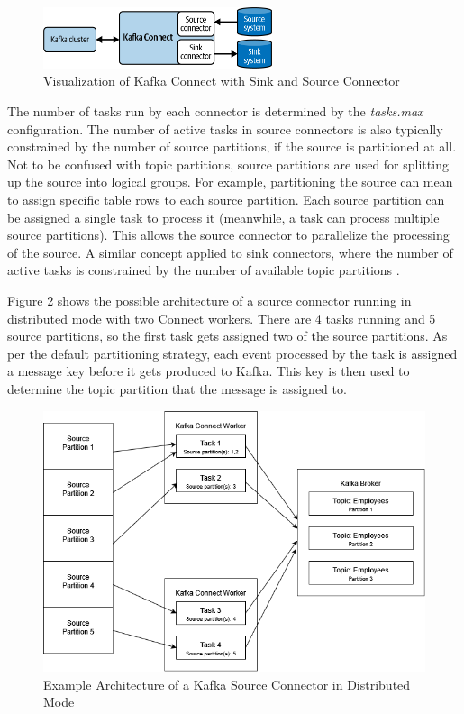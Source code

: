 \begin{figure}[htbp]
 \centering
 \includegraphics[width=0.6\textwidth]{chapters/images/kafkaconnectexample.png}
 \caption{Visualization of Kafka Connect with Sink and Source Connector \cite{maison2023kafkaconnect}}
 \label{fig:fundamentals:kafkaconnectexample}
\end{figure}

The number of tasks run by each connector is determined by the \textit{tasks.max} configuration. The number of active tasks in source connectors is also typically constrained by the number of source partitions, if the source is partitioned at all. Not to be confused with topic partitions, source partitions are used for splitting up the source into logical groups. For example, partitioning the source can mean to assign specific table rows to each source partition. Each source partition can be assigned a single task to process it (meanwhile, a task can process multiple source partitions). This allows the source connector to parallelize the processing of the source. A similar concept applied to sink connectors, where the number of active tasks is constrained by the number of available topic partitions \cite{maison2023kafkaconnect}.

Figure \ref{fig:fundamentals:kafkaconnectarchitecture} shows the possible architecture of a source connector running in distributed mode with two Connect workers. There are 4 tasks running and 5 source partitions, so the first task gets assigned two of the source partitions. As per the default partitioning strategy, each event processed by the task is assigned a message key before it gets produced to Kafka. This key is then used to determine the topic partition that the message is assigned to.

\begin{figure}[htbp]
 \centering
 \includegraphics[width=1\textwidth]{chapters/images/kafka connect architecture.drawio.png}
 \caption{Example Architecture of a Kafka Source Connector in Distributed Mode}
 \label{fig:fundamentals:kafkaconnectarchitecture}
\end{figure}


